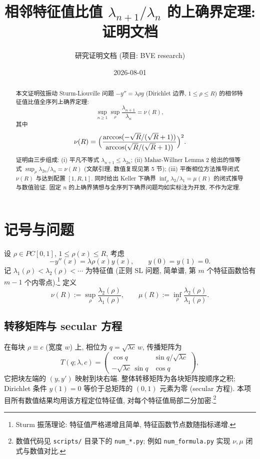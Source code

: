 \documentclass[UTF8]{ctexart}
\title{相邻特征值比值 \texorpdfstring{$\lambda_{n+1}/\lambda_n$}{lambda_{n+1}/lambda_n} 的上确界定理: 证明文档}
\author{研究证明文档 (项目: BVE research)}
\date{2026-08-01}
\begin{document}
\maketitle

\begin{abstract}
本文证明弦振动 Sturm-Liouville 问题 $-y'' = \lambda\rho y$ (Dirichlet 边界,
$1 \leq \rho \leq R$) 的相邻特征值比值全序列上确界定理:
\[
	\sup_{n\geq 1}\sup_{\rho} \frac{\lambda_{n+1}}{\lambda_n} = \nu(R),
\]
其中
\[
	\nu(R) = \Bigl( \frac{\arccos(-\sqrt{R}/(\sqrt{R}+1))}{\arccos(\sqrt{R}/(\sqrt{R}+1))} \Bigr)^2 .
\]
证明由三步组成: (i) 平凡不等式 $\lambda_{n+1} \leq \lambda_{2n}$;
(ii) Mahar-Willner Lemma 2 给出的恒等式 $\sup_\rho \lambda_{2n}/\lambda_n = \nu(R)$
(文献引理, 数值复现见第 5 节);
(iii) 平衡相位方法推导闭式 $\nu(R)$ 与达到配置 $[1,R,1]$.
同时给出 Keller 下确界 $\inf_\rho \lambda_2/\lambda_1 = \mu(R)$ 的闭式推导与数值验证.
固定 $n$ 的上确界猜想与全序列下确界问题均如实标注为开放, 不作为定理.
\end{abstract}

\tableofcontents

\section{记号与问题}

设 $\rho \in PC[0,1]$, $1 \leq \rho(x) \leq R$, 考虑
\begin{equation}
	-y''(x) = \lambda \rho(x) y(x), \qquad y(0) = y(1) = 0 .
\end{equation}
记 $\lambda_1(\rho) < \lambda_2(\rho) < \cdots$ 为特征值
(正则 SL 问题, 简单谱, 第 $m$ 个特征函数恰有 $m-1$ 个内零点).\footnote{Sturm 振荡理论: 特征值严格递增且简单, 特征函数节点数随指标递增.}
定义
\begin{equation}
	\nu(R) := \sup_{\rho} \frac{\lambda_2(\rho)}{\lambda_1(\rho)},
	\qquad
	\mu(R) := \inf_{\rho} \frac{\lambda_2(\rho)}{\lambda_1(\rho)} .
\end{equation}

\subsection{转移矩阵与 secular 方程}

在每块 $\rho \equiv c$ (宽度 $w$) 上, 相位为 $q = \sqrt{\lambda c}\,w$, 传播矩阵为
\begin{equation}
	T(q; \lambda, c) =
	\begin{pmatrix}
		\cos q & \sin q / \sqrt{\lambda c} \\
		-\sqrt{\lambda c}\,\sin q & \cos q
	\end{pmatrix},
\end{equation}
它把块左端的 $(y, y')$ 映射到块右端. 整体转移矩阵为各块矩阵按顺序之积;
Dirichlet 条件 $y(1) = 0$ 等价于总矩阵的 $(0,1)$ 元素为零 (secular 方程).
本项目所有数值结果均用该方程定位特征值, 对每个特征值局部二分加密.\footnote{数值代码见 \texttt{scripts/} 目录下的 \texttt{num\_*.py}; 例如 \texttt{num\_formula.py} 实现 $\nu, \mu$ 闭式与数值对比.}
\end{document}
